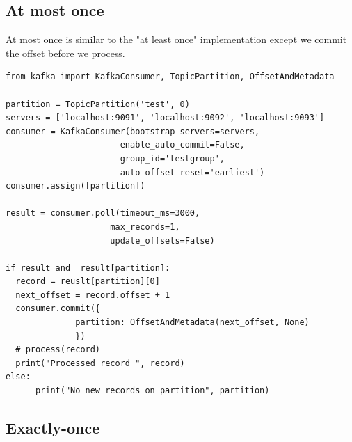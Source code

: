 \documentclass[11pt]{article}
\begin{document}
\subsection{At most once}
At most once is similar to the "at least once" implementation except we commit the offset before we process.
\newline
\begin{adjustwidth}{-30pt}{0pt}
\begin{Verbatim}
from kafka import KafkaConsumer, TopicPartition, OffsetAndMetadata

partition = TopicPartition('test', 0)
servers = ['localhost:9091', 'localhost:9092', 'localhost:9093']
consumer = KafkaConsumer(bootstrap_servers=servers,
                       enable_auto_commit=False,
                       group_id='testgroup',
                       auto_offset_reset='earliest')
consumer.assign([partition])

result = consumer.poll(timeout_ms=3000,
                     max_records=1,
                     update_offsets=False)

if result and  result[partition]:
  record = reuslt[partition][0]
  next_offset = record.offset + 1
  consumer.commit({
              partition: OffsetAndMetadata(next_offset, None)
              })
  # process(record)
  print("Processed record ", record)
else:
      print("No new records on partition", partition)

\end{Verbatim}
\end{adjustwidth}
\clearpage
\subsection{Exactly-once}
\end{document}

